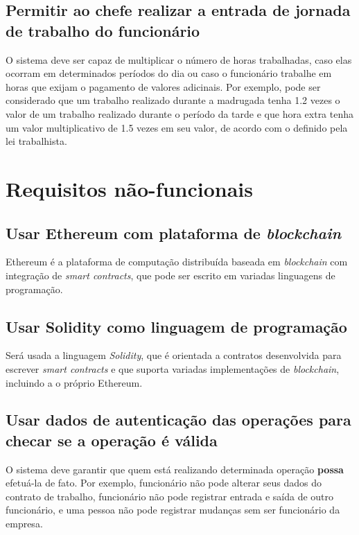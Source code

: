 \documentclass{article}
\begin{document}
\subsection{Permitir ao chefe realizar a entrada de jornada de trabalho do funcionário}
O sistema deve ser capaz de multiplicar o número de horas trabalhadas, caso elas
ocorram em determinados períodos do dia ou caso o funcionário trabalhe em horas que exijam o pagamento de valores adicinais.
Por exemplo, pode ser considerado que um trabalho realizado durante a madrugada
tenha 1.2 vezes o valor de um trabalho realizado durante o período da tarde e que
hora extra tenha um valor multiplicativo de 1.5 vezes em seu valor, de acordo com o definido pela lei trabalhista.

\section{Requisitos não-funcionais}

\subsection{Usar Ethereum com plataforma de \textit{blockchain}}
Ethereum é a plataforma de computação distribuída baseada em \textit{blockchain} com integração de \textit{smart contracts}, que pode ser escrito em variadas
linguagens de programação.

\subsection{Usar Solidity como linguagem de programação}
Será usada a linguagem \textit{Solidity}, que é orientada a contratos desenvolvida para
escrever \textit{smart contracts} e que suporta variadas implementações de \textit{blockchain}, incluindo a o próprio Ethereum.

\subsection{Usar dados de autenticação das operações para checar se a operação é válida}
O sistema deve garantir que quem está realizando determinada operação \textbf{possa} efetuá-la de fato. Por exemplo, funcionário não pode alterar seus dados do contrato de trabalho, funcionário não pode registrar entrada e saída de outro funcionário, e uma pessoa não pode registrar mudanças sem ser funcionário da empresa.
\end{document}

